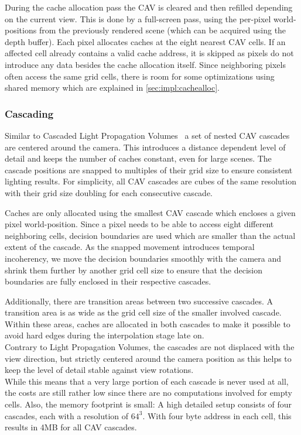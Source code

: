 \documentclass[thesis.tex]{subfiles}
\begin{document}
During the cache allocation pass the CAV is cleared and then refilled depending on the current view.
This is done by a full-screen pass, using the per-pixel world-positions from the previously rendered scene (which can be acquired using the depth buffer).
Each pixel allocates caches at the eight nearest CAV cells.
If an affected cell already contains a valid cache address, it is skipped as pixels do not introduce any data besides the cache allocation itself.
Since neighboring pixels often access the same grid cells, there is room for some optimizations using shared memory which are explained in \autoref{sec:impl:cachealloc}.

\subsubsection{Cascading}
Similar to Cascaded Light Propagation Volumes~\cite{bib:lpt} a set of nested CAV cascades are centered around the camera.
This introduces a distance dependent level of detail and keeps the number of caches constant, even for large scenes.
The cascade positions are snapped to multiples of their grid size to ensure consistent lighting results. 
For simplicity, all CAV cascades are cubes of the same resolution with their grid size doubling for each consecutive cascade.

Caches are only allocated using the smallest CAV cascade which encloses a given pixel world-position.
Since a pixel needs to be able to access eight different neighboring cells, decision boundaries are used which are smaller than the actual extent of the cascade.
As the snapped movement introduces temporal incoherency, we move the decision boundaries smoothly with the camera and shrink them further by another grid cell size to ensure that the decision boundaries are fully enclosed in their respective cascades.

Additionally, there are transition areas between two successive cascades.
A transition area is as wide as the grid cell size of the smaller involved cascade.
Within these areas, caches are allocated in both cascades to make it possible to avoid hard edges during the interpolation stage late on.\\

Contrary to Light Propagation Volumes, the cascades are not displaced with the view direction, but strictly centered around the camera position as this helps to keep the level of detail stable against view rotations.\\
While this means that a very large portion of each cascade is never used at all, the costs are still rather low since there are no computations involved for empty cells.
Also, the memory footprint is small: %
A high detailed setup consists of four cascades, each with a resolution of $64^3$.
With four byte address in each cell, this results in 4MB for all CAV cascades.
\end{document}
